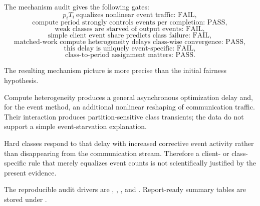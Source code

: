 The mechanism audit gives the following gates:
\begin{equation}
\boxed{p_iT_i\ \text{equalizes nonlinear event traffic: FAIL}},
\end{equation}
\begin{equation}
\boxed{\text{compute period strongly controls events per completion: PASS}},
\end{equation}
\begin{equation}
\boxed{\text{weak classes are starved of output events: FAIL}},
\end{equation}
\begin{equation}
\boxed{\text{simple client event share predicts class failure: FAIL}},
\end{equation}
\begin{equation}
\boxed{\text{matched-work compute heterogeneity delays class-wise convergence: PASS}},
\end{equation}
\begin{equation}
\boxed{\text{this delay is uniquely event-specific: FAIL}},
\end{equation}
\begin{equation}
\boxed{\text{class-to-period assignment matters: PASS}}.
\end{equation}

The resulting mechanism picture is more precise than the initial fairness hypothesis.
\begin{takeawaybox}[title={Experiment 14C mechanism summary}]
Compute heterogeneity produces a general asynchronous optimization delay and, for the event method, an additional nonlinear reshaping of communication traffic. Their interaction produces partition-sensitive class transients; the data do not support a simple event-starvation explanation.
\end{takeawaybox}
Hard classes respond to that delay with increased corrective event activity rather than disappearing from the communication stream. Therefore a client- or class-specific rule that merely equalizes event counts is not scientifically justified by the present evidence.

The reproducible audit drivers are
,
,
, and
. Report-ready summary tables are
stored under .
